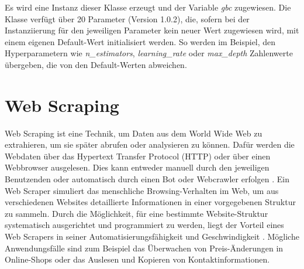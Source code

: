 \documentclass[german,bachelor]{swsLeipzig}
\begin{document}
Es wird eine Instanz dieser Klasse erzeugt und der Variable \textit{gbc} zugewiesen.
Die Klasse verfügt über 20 Parameter (Version 1.0.2), die, sofern bei der Instanziierung für den jeweiligen Parameter
kein neuer Wert zugewiesen wird, mit einem eigenen Default-Wert initialisiert werden.
So werden im Beispiel, den Hyperparametern wie \textit{n\_estimators}, \textit{learning\_rate} oder \textit{max\_depth}
Zahlenwerte übergeben, die von den Default-Werten abweichen.\\


\section{Web Scraping}
Web Scraping ist eine Technik, um Daten aus dem World Wide Web zu extrahieren, um sie später abrufen oder analysieren zu können.
Dafür werden die Webdaten über das Hypertext Transfer Protocol (HTTP) oder über einen Webbrowser ausgelesen.
Dies kann entweder manuell durch den jeweiligen Benutzenden oder automatisch durch einen Bot oder Webcrawler erfolgen \cite[]{zhao2017web}.
Ein Web Scraper simuliert das menschliche Browsing-Verhalten im Web, um aus verschiedenen Websites
detaillierte Informationen in einer vorgegebenen Struktur zu sammeln.
Durch die Möglichkeit, für eine bestimmte Website-Struktur systematisch ausgerichtet und programmiert zu werden, liegt der Vorteil
eines Web Scrapers in seiner Automatisierungsfähigkeit und Geschwindigkeit \cite[]{9005594}.
Mögliche Anwendungsfälle sind zum Beispiel das Überwachen von Preis-Änderungen in Online-Shops oder das Auslesen und Kopieren
von Kontaktinformationen.\\
\end{document}
